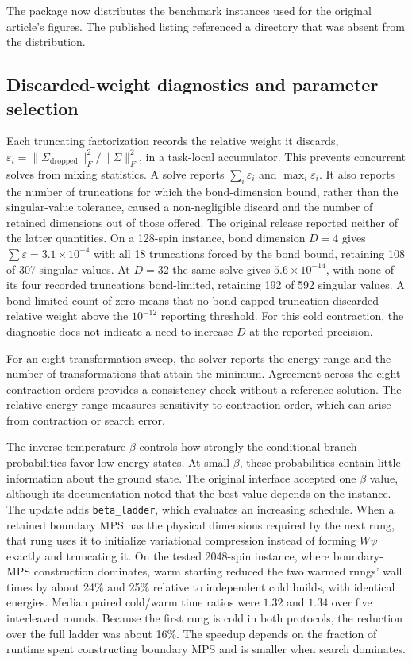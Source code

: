 \documentclass[preprint,12pt,a4paper]{elsarticle}
\begin{document}
The package now distributes the benchmark instances used for the original
article's figures. The published listing referenced a directory that was absent
from the distribution.

\subsection{Discarded-weight diagnostics and parameter selection}

Each truncating factorization records the relative weight it discards,
$\varepsilon_i = \lVert\Sigma_{\text{dropped}}\rVert_F^2/
\lVert\Sigma\rVert_F^2$, in a task-local accumulator. This prevents concurrent
solves from mixing statistics. A solve reports $\sum_i\varepsilon_i$ and
$\max_i\varepsilon_i$. It also reports the number of truncations for which the
bond-dimension bound, rather than the singular-value tolerance, caused a
non-negligible discard and the number of retained dimensions out of those
offered. The original release reported neither of the latter quantities. On a
128-spin instance, bond dimension $D=4$ gives $\sum\varepsilon =
3.1\times10^{-4}$ with all 18 truncations forced by the bond bound, retaining
108 of 307 singular values. At $D=32$ the same solve gives $5.6\times10^{-14}$,
with none of its four recorded truncations bond-limited, retaining 192 of 592
singular values. A bond-limited count of zero means that no bond-capped
truncation discarded relative weight above the $10^{-12}$ reporting threshold.
For this cold contraction, the diagnostic does not indicate a need to increase
$D$ at the reported precision.

For an eight-transformation sweep, the solver reports the energy range and the
number of transformations that attain the minimum. Agreement across the eight
contraction orders provides a consistency check without a reference solution.
The relative energy range measures sensitivity to contraction order, which can
arise from contraction or search error.

The inverse temperature $\beta$ controls how strongly the conditional branch
probabilities favor low-energy states. At small $\beta$, these probabilities
contain little information about the ground state. The original interface
accepted one $\beta$ value, although its documentation noted that the best value
depends on the instance. The update adds \texttt{beta\_ladder}, which evaluates an
increasing schedule. When a retained boundary MPS has the physical dimensions
required by the next rung, that rung uses it to initialize variational
compression instead of forming $W\psi$ exactly and truncating it. On the tested
2048-spin instance, where
boundary-MPS construction dominates, warm starting reduced the two warmed rungs'
wall times by about 24\% and 25\% relative to independent cold builds, with
identical energies. Median paired cold/warm time ratios were $1.32$ and $1.34$
over five interleaved rounds.
Because the first rung is cold in both protocols, the reduction over the full
ladder was about 16\%. The speedup depends on the fraction of runtime spent
constructing boundary MPS and is smaller when search dominates.
\end{document}

